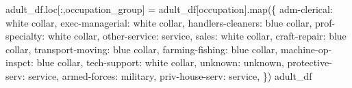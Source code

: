 \documentclass[
  letterpaper,
  DIV=11,
  numbers=noendperiod]{scrartcl}
\newenvironment{Shaded}{\begin{snugshade}}{\end{snugshade}}
\newcommand{\BuiltInTok}[1]{\textcolor[rgb]{0.00,0.23,0.31}{#1}}
\newcommand{\NormalTok}[1]{\textcolor[rgb]{0.00,0.23,0.31}{#1}}
\newcommand{\OperatorTok}[1]{\textcolor[rgb]{0.37,0.37,0.37}{#1}}
\newcommand{\StringTok}[1]{\textcolor[rgb]{0.13,0.47,0.30}{#1}}
\begin{document}
\begin{Shaded}
\begin{Highlighting}[]
\NormalTok{adult\_df.loc[:,}\StringTok{\textquotesingle{}occupation\_group\textquotesingle{}}\NormalTok{] }\OperatorTok{=}\NormalTok{ adult\_df[}\StringTok{\textquotesingle{}occupation\textquotesingle{}}\NormalTok{].}\BuiltInTok{map}\NormalTok{(\{}
    \StringTok{\textquotesingle{}adm{-}clerical\textquotesingle{}}\NormalTok{: }\StringTok{\textquotesingle{}white collar\textquotesingle{}}\NormalTok{,}
    \StringTok{\textquotesingle{}exec{-}managerial\textquotesingle{}}\NormalTok{: }\StringTok{\textquotesingle{}white collar\textquotesingle{}}\NormalTok{, }
    \StringTok{\textquotesingle{}handlers{-}cleaners\textquotesingle{}}\NormalTok{: }\StringTok{\textquotesingle{}blue collar\textquotesingle{}}\NormalTok{, }
    \StringTok{\textquotesingle{}prof{-}specialty\textquotesingle{}}\NormalTok{: }\StringTok{\textquotesingle{}white collar\textquotesingle{}}\NormalTok{, }
    \StringTok{\textquotesingle{}other{-}service\textquotesingle{}}\NormalTok{: }\StringTok{\textquotesingle{}service\textquotesingle{}}\NormalTok{, }
    \StringTok{\textquotesingle{}sales\textquotesingle{}}\NormalTok{: }\StringTok{\textquotesingle{}white collar\textquotesingle{}}\NormalTok{, }
    \StringTok{\textquotesingle{}craft{-}repair\textquotesingle{}}\NormalTok{: }\StringTok{\textquotesingle{}blue collar\textquotesingle{}}\NormalTok{,}
    \StringTok{\textquotesingle{}transport{-}moving\textquotesingle{}}\NormalTok{: }\StringTok{\textquotesingle{}blue collar\textquotesingle{}}\NormalTok{, }
    \StringTok{\textquotesingle{}farming{-}fishing\textquotesingle{}}\NormalTok{: }\StringTok{\textquotesingle{}blue collar\textquotesingle{}}\NormalTok{, }
    \StringTok{\textquotesingle{}machine{-}op{-}inspct\textquotesingle{}}\NormalTok{: }\StringTok{\textquotesingle{}blue collar\textquotesingle{}}\NormalTok{, }
    \StringTok{\textquotesingle{}tech{-}support\textquotesingle{}}\NormalTok{: }\StringTok{\textquotesingle{}white collar\textquotesingle{}}\NormalTok{, }
    \StringTok{\textquotesingle{}unknown\textquotesingle{}}\NormalTok{: }\StringTok{\textquotesingle{}unknown\textquotesingle{}}\NormalTok{, }
    \StringTok{\textquotesingle{}protective{-}serv\textquotesingle{}}\NormalTok{: }\StringTok{\textquotesingle{}service\textquotesingle{}}\NormalTok{, }
    \StringTok{\textquotesingle{}armed{-}forces\textquotesingle{}}\NormalTok{: }\StringTok{\textquotesingle{}military\textquotesingle{}}\NormalTok{, }
    \StringTok{\textquotesingle{}priv{-}house{-}serv\textquotesingle{}}\NormalTok{: }\StringTok{\textquotesingle{}service\textquotesingle{}}\NormalTok{,}
\NormalTok{\})}
\NormalTok{adult\_df}
\end{Highlighting}
\end{Shaded}
\end{document}
